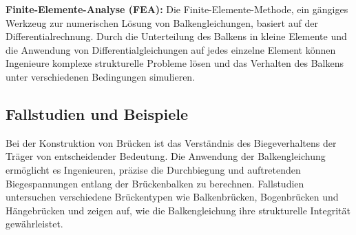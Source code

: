 \textbf{ Finite-Elemente-Analyse (FEA):}
Die Finite-Elemente-Methode, ein gängiges Werkzeug zur numerischen Lösung von Balkengleichungen, basiert auf der Differentialrechnung. 
Durch die Unterteilung des Balkens in kleine Elemente und die Anwendung von Differentialgleichungen auf jedes einzelne Element können Ingenieure komplexe strukturelle Probleme lösen und das Verhalten des Balkens unter verschiedenen Bedingungen simulieren.

\subsection{Fallstudien und Beispiele
\label{Fallstudien und Beispiele}}
Bei der Konstruktion von Brücken ist das Verständnis des Biegeverhaltens der Träger von entscheidender Bedeutung. 
Die Anwendung der Balkengleichung ermöglicht es Ingenieuren, präzise die Durchbiegung und auftretenden Biegespannungen entlang der Brückenbalken zu berechnen. 
Fallstudien untersuchen verschiedene Brückentypen wie Balkenbrücken, Bogenbrücken und Hängebrücken und zeigen auf, wie die Balkengleichung ihre strukturelle Integrität gewährleistet.

